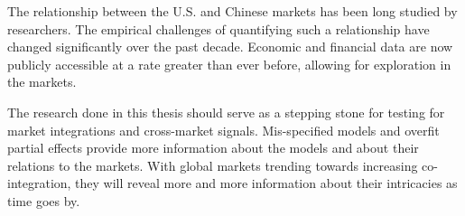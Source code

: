 The relationship between the U.S. and Chinese markets has been long studied by researchers. The empirical challenges of quantifying such a relationship have changed significantly over the past decade. Economic and financial data are now publicly accessible at a rate greater than ever before, allowing for exploration in the markets.

The research done in this thesis should serve as a stepping stone for testing for market integrations and cross-market signals. Mis-specified models and overfit partial effects provide more information about the models and about their relations to the markets. With global markets trending towards increasing co-integration, they will reveal more and more information about their intricacies as time goes by. 